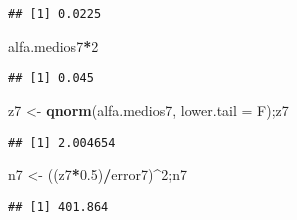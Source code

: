 \documentclass[
]{article}
\newenvironment{Shaded}{\begin{snugshade}}{\end{snugshade}}
\newcommand{\AttributeTok}[1]{\textcolor[rgb]{0.13,0.29,0.53}{#1}}
\newcommand{\DecValTok}[1]{\textcolor[rgb]{0.00,0.00,0.81}{#1}}
\newcommand{\FloatTok}[1]{\textcolor[rgb]{0.00,0.00,0.81}{#1}}
\newcommand{\FunctionTok}[1]{\textcolor[rgb]{0.13,0.29,0.53}{\textbf{#1}}}
\newcommand{\NormalTok}[1]{#1}
\newcommand{\OtherTok}[1]{\textcolor[rgb]{0.56,0.35,0.01}{#1}}
\newcommand{\SpecialCharTok}[1]{\textcolor[rgb]{0.81,0.36,0.00}{\textbf{#1}}}
\begin{document}
\begin{verbatim}
## [1] 0.0225
\end{verbatim}

\begin{Shaded}
\begin{Highlighting}[]
\NormalTok{alfa.medios7}\SpecialCharTok{*}\DecValTok{2}
\end{Highlighting}
\end{Shaded}

\begin{verbatim}
## [1] 0.045
\end{verbatim}

\begin{Shaded}
\begin{Highlighting}[]
\NormalTok{z7 }\OtherTok{\textless{}{-}} \FunctionTok{qnorm}\NormalTok{(alfa.medios7, }\AttributeTok{lower.tail =}\NormalTok{ F);z7}
\end{Highlighting}
\end{Shaded}

\begin{verbatim}
## [1] 2.004654
\end{verbatim}

\begin{Shaded}
\begin{Highlighting}[]
\NormalTok{n7 }\OtherTok{\textless{}{-}}\NormalTok{ ((z7}\SpecialCharTok{*}\FloatTok{0.5}\NormalTok{)}\SpecialCharTok{/}\NormalTok{error7)}\SpecialCharTok{\^{}}\DecValTok{2}\NormalTok{;n7}
\end{Highlighting}
\end{Shaded}

\begin{verbatim}
## [1] 401.864
\end{verbatim}
\end{document}
